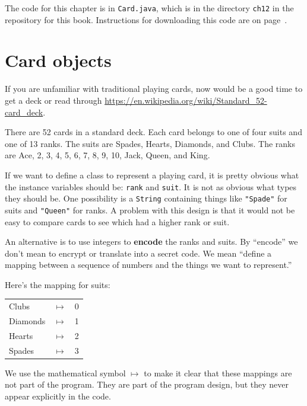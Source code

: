 \documentclass[12pt]{book}
\theoremstyle{exercise}
\newcommand{\java}[1]{\verb"#1"}
\begin{document}
The code for this chapter is in \java{Card.java}, which is in the directory {\tt ch12} in the repository for this book.
Instructions for downloading this code are on page~\pageref{code}.


\section{Card objects}
\label{card}


If you are unfamiliar with traditional playing cards, now would be a good time to get a deck or read through \url{https://en.wikipedia.org/wiki/Standard_52-card_deck}.


There are 52 cards in a standard deck.
Each card belongs to one of four suits and one of 13 ranks.
The suits are Spades, Hearts, Diamonds, and Clubs.
The ranks are Ace, 2, 3, 4, 5, 6, 7, 8, 9, 10, Jack, Queen, and King.

If we want to define a class to represent a playing card, it is pretty obvious what the instance variables should be: \java{rank} and \java{suit}.
It is not as obvious what types they should be.
One possibility is a \java{String} containing things like \verb|"Spade"| for suits and \verb|"Queen"| for ranks.
A problem with this design is that it would not be easy to compare cards to see which had a higher rank or suit.


An alternative is to use integers to {\bf encode} the ranks and suits.
By ``encode'' we don't mean to encrypt or translate into a secret code.
We mean ``define a mapping between a sequence of numbers and the things we want to represent.''

Here's the mapping for suits:

\begin{tabular}{l c l}
Clubs & $\mapsto$ & 0 \\
Diamonds & $\mapsto$ & 1 \\
Hearts & $\mapsto$ & 2 \\
Spades & $\mapsto$ & 3
\end{tabular}


We use the mathematical symbol $\mapsto$ to make it clear that these mappings are not part of the program.
They are part of the program design, but they never appear explicitly in the code.
\end{document}
